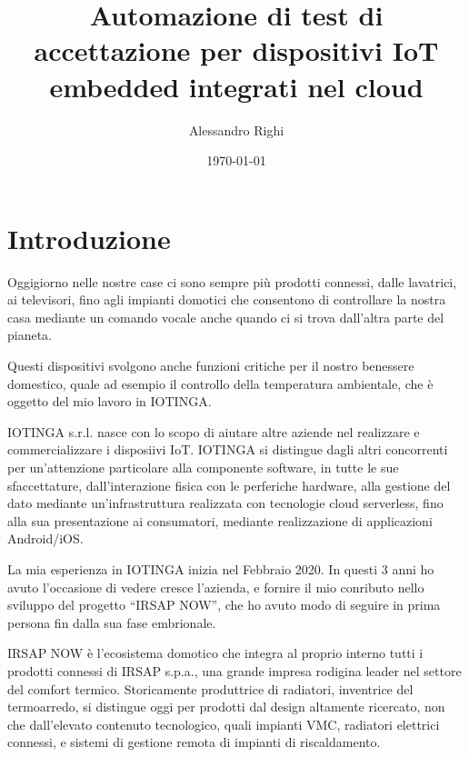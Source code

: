 \documentclass[a4paper,titlepage]{article}
\title{Automazione di test di accettazione per dispositivi IoT embedded integrati nel cloud}
\author{Alessandro Righi}
\date{\today}
\begin{document}
\begin{frontespizio}
\end{frontespizio}
\tableofcontents
\pagebreak

\section{Introduzione}

Oggigiorno nelle nostre case ci sono sempre più prodotti connessi, 
dalle lavatrici, ai televisori, fino agli impianti domotici che 
consentono di controllare la nostra casa mediante un comando vocale
anche quando ci si trova dall'altra parte del pianeta. 

Questi dispositivi svolgono anche funzioni critiche per il nostro 
benessere domestico, quale ad esempio il controllo della temperatura
ambientale, che è oggetto del mio lavoro in IOTINGA. 

IOTINGA s.r.l. nasce con lo scopo di aiutare altre aziende nel realizzare e 
commercializzare i disposiivi IoT. IOTINGA si distingue dagli altri 
concorrenti per un'attenzione particolare alla componente software,
in tutte le sue sfaccettature, dall'interazione fisica con le perferiche 
hardware, alla gestione del dato mediante un'infrastruttura realizzata 
con tecnologie cloud serverless, fino alla sua presentazione ai consumatori, 
mediante realizzazione di applicazioni Android/iOS. 

La mia esperienza in IOTINGA inizia nel Febbraio 2020. In questi 3 anni 
ho avuto l'occasione di vedere cresce l'azienda, e fornire il mio conributo 
nello sviluppo del progetto ``IRSAP NOW'', che ho avuto modo di seguire 
in prima persona fin dalla sua fase embrionale.

IRSAP NOW è l'ecosistema domotico che integra al proprio interno tutti 
i prodotti connessi di IRSAP s.p.a., una grande impresa rodigina leader 
nel settore del comfort termico. Storicamente produttrice di radiatori,
inventrice del termoarredo, si distingue oggi per prodotti dal design altamente
ricercato, non che dall'elevato contenuto tecnologico, quali impianti VMC, 
radiatori elettrici connessi, e sistemi di gestione remota di impianti di riscaldamento.
\end{document}
